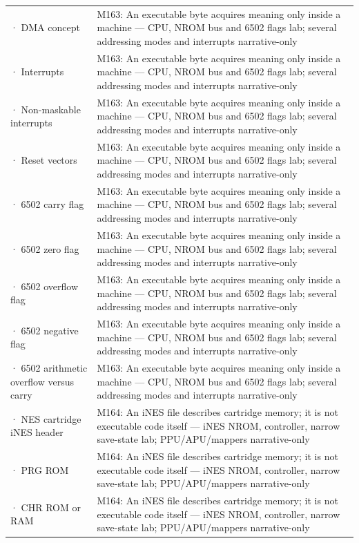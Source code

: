 {\begin{longtable}[]{@{}
  >{\raggedright\arraybackslash}p{}
  >{\raggedright\arraybackslash}p{}@{}}
2720 · DMA concept & M163: An executable byte acquires meaning only inside a machine --- CPU, NROM bus and 6502 flags lab; several addressing modes and interrupts narrative-only \\
2721 · Interrupts & M163: An executable byte acquires meaning only inside a machine --- CPU, NROM bus and 6502 flags lab; several addressing modes and interrupts narrative-only \\
2722 · Non-maskable interrupts & M163: An executable byte acquires meaning only inside a machine --- CPU, NROM bus and 6502 flags lab; several addressing modes and interrupts narrative-only \\
2723 · Reset vectors & M163: An executable byte acquires meaning only inside a machine --- CPU, NROM bus and 6502 flags lab; several addressing modes and interrupts narrative-only \\
2724 · 6502 carry flag & M163: An executable byte acquires meaning only inside a machine --- CPU, NROM bus and 6502 flags lab; several addressing modes and interrupts narrative-only \\
2725 · 6502 zero flag & M163: An executable byte acquires meaning only inside a machine --- CPU, NROM bus and 6502 flags lab; several addressing modes and interrupts narrative-only \\
2726 · 6502 overflow flag & M163: An executable byte acquires meaning only inside a machine --- CPU, NROM bus and 6502 flags lab; several addressing modes and interrupts narrative-only \\
2727 · 6502 negative flag & M163: An executable byte acquires meaning only inside a machine --- CPU, NROM bus and 6502 flags lab; several addressing modes and interrupts narrative-only \\
2728 · 6502 arithmetic overflow versus carry & M163: An executable byte acquires meaning only inside a machine --- CPU, NROM bus and 6502 flags lab; several addressing modes and interrupts narrative-only \\
2729 · NES cartridge iNES header & M164: An iNES file describes cartridge memory; it is not executable code itself --- iNES NROM, controller, narrow save-state lab; PPU/APU/mappers narrative-only \\
2730 · PRG ROM & M164: An iNES file describes cartridge memory; it is not executable code itself --- iNES NROM, controller, narrow save-state lab; PPU/APU/mappers narrative-only \\
2731 · CHR ROM or RAM & M164: An iNES file describes cartridge memory; it is not executable code itself --- iNES NROM, controller, narrow save-state lab; PPU/APU/mappers narrative-only \\

\end{longtable}}
